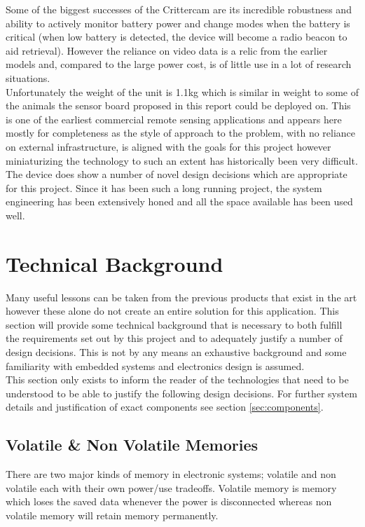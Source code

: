 \documentclass[12pt,openany,a4paper]{book}
\begin{document}
			 Some of the biggest successes of the Crittercam are its incredible robustness and ability to actively monitor battery power and change modes when the battery is critical (when low battery is detected, the device will become a radio beacon to aid retrieval). However the reliance on video data is a relic from the earlier models and, compared to the large power cost, is of little use in a lot of research situations.\\
			 
			  Unfortunately the weight of the unit is 1.1kg which is similar in weight to some of the animals the sensor board proposed in this report could be deployed on. This is one of the earliest commercial remote sensing applications and appears here mostly for completeness as the style of approach to the problem, with no reliance on external infrastructure, is aligned with the goals for this project however miniaturizing the technology to such an extent has historically been very difficult.\\
			  
			  The device does show a number of novel design decisions which are appropriate for this project. Since it has been such a long running project, the system engineering has been extensively honed and all the space available has been used well. 
	\newpage
	
	
	\section{Technical Background}
		Many useful lessons can be taken from the previous products that exist in the art however these alone do not create an entire solution for this application. This section will provide some technical background that is necessary to both fulfill the requirements set out by this project and to adequately justify a number of design decisions. This is not by any means an exhaustive background and some familiarity with embedded systems and electronics design is assumed. \\
		
		 This section only exists to inform the reader of the technologies that need to be understood to be able to justify the following design decisions. For further system details and justification of exact components see section \ref{sec:components}. 
			
		\subsection{Volatile \& Non Volatile Memories} \label{sec:volatile}
			There are two major kinds of memory in electronic systems; volatile and non volatile each with their own power/use tradeoffs. Volatile memory is memory which loses the saved data whenever the power is disconnected whereas non volatile memory will retain memory permanently. \\
			
\end{document}
